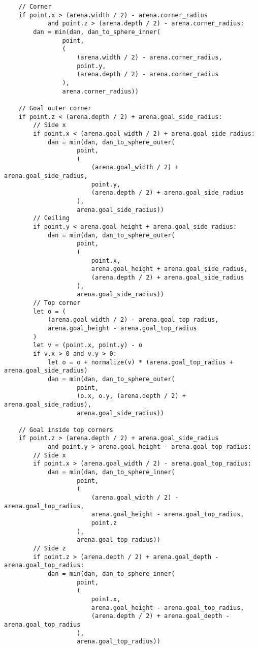 \begin{verbatim}
    // Corner
    if point.x > (arena.width / 2) - arena.corner_radius
            and point.z > (arena.depth / 2) - arena.corner_radius:
        dan = min(dan, dan_to_sphere_inner(
                point,
                (
                    (arena.width / 2) - arena.corner_radius,
                    point.y,
                    (arena.depth / 2) - arena.corner_radius
                ),
                arena.corner_radius))

    // Goal outer corner
    if point.z < (arena.depth / 2) + arena.goal_side_radius:
        // Side x
        if point.x < (arena.goal_width / 2) + arena.goal_side_radius:
            dan = min(dan, dan_to_sphere_outer(
                    point,
                    (
                        (arena.goal_width / 2) + arena.goal_side_radius,
                        point.y,
                        (arena.depth / 2) + arena.goal_side_radius
                    ),
                    arena.goal_side_radius))
        // Ceiling
        if point.y < arena.goal_height + arena.goal_side_radius:
            dan = min(dan, dan_to_sphere_outer(
                    point,
                    (
                        point.x,
                        arena.goal_height + arena.goal_side_radius,
                        (arena.depth / 2) + arena.goal_side_radius
                    ),
                    arena.goal_side_radius))
        // Top corner
        let o = (
            (arena.goal_width / 2) - arena.goal_top_radius,
            arena.goal_height - arena.goal_top_radius
        )
        let v = (point.x, point.y) - o
        if v.x > 0 and v.y > 0:
            let o = o + normalize(v) * (arena.goal_top_radius + arena.goal_side_radius)
            dan = min(dan, dan_to_sphere_outer(
                    point,
                    (o.x, o.y, (arena.depth / 2) + arena.goal_side_radius),
                    arena.goal_side_radius))

    // Goal inside top corners
    if point.z > (arena.depth / 2) + arena.goal_side_radius
            and point.y > arena.goal_height - arena.goal_top_radius:
        // Side x
        if point.x > (arena.goal_width / 2) - arena.goal_top_radius:
            dan = min(dan, dan_to_sphere_inner(
                    point,
                    (
                        (arena.goal_width / 2) - arena.goal_top_radius,
                        arena.goal_height - arena.goal_top_radius,
                        point.z
                    ),
                    arena.goal_top_radius))
        // Side z
        if point.z > (arena.depth / 2) + arena.goal_depth - arena.goal_top_radius:
            dan = min(dan, dan_to_sphere_inner(
                    point,
                    (
                        point.x,
                        arena.goal_height - arena.goal_top_radius,
                        (arena.depth / 2) + arena.goal_depth - arena.goal_top_radius
                    ),
                    arena.goal_top_radius))


\end{verbatim}
